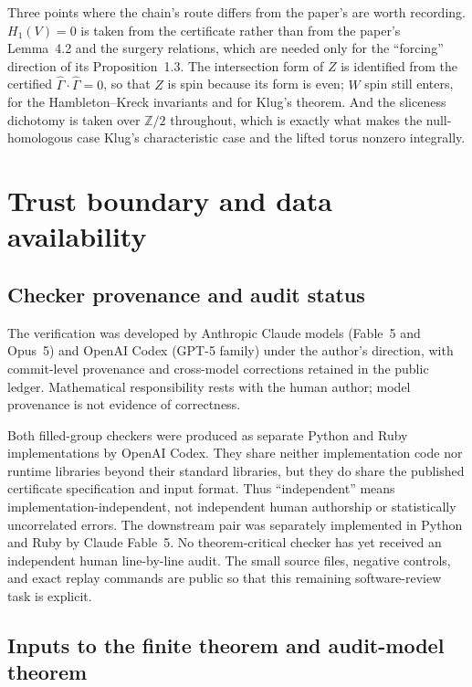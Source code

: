 \documentclass[11pt]{article}
\newcommand{\Z}{\mathbb{Z}}
\newcommand{\Ghat}{\widehat{\Gamma}}
\theoremstyle{definition}
\begin{document}
Three points where the chain's route differs from the paper's are worth
recording. $H_1(V)=0$ is taken from the certificate rather than from the
paper's Lemma~4.2 and the surgery relations, which are needed only for
the ``forcing'' direction of its Proposition~1.3. The intersection form
of $Z$ is identified from the certified $\Ghat\cdot\Ghat=0$, so that $Z$
is spin because its form is even; $W$ spin still enters, for the
Hambleton--Kreck invariants and for Klug's theorem. And the sliceness
dichotomy is taken over $\Z/2$ throughout, which is exactly what makes
the null-homologous case Klug's characteristic case and the lifted torus
nonzero integrally.

\section{Trust boundary and data availability}\label{sec:trust}

\subsection*{Checker provenance and audit status}

The verification was developed by Anthropic Claude models (Fable~5 and
Opus~5) and OpenAI Codex (GPT-5 family) under the author's direction, with
commit-level provenance and cross-model corrections retained in the public
ledger.  Mathematical responsibility rests with the human author; model
provenance is not evidence of correctness.

Both filled-group checkers were produced as separate Python and Ruby
implementations by OpenAI Codex.  They share neither implementation code nor
runtime libraries beyond their standard libraries, but they do share the
published certificate specification and input format.  Thus ``independent''
means implementation-independent, not independent human authorship or
statistically uncorrelated errors.  The downstream pair was separately
implemented in Python and Ruby by Claude Fable~5.  No theorem-critical
checker has yet received an independent human line-by-line audit.  The small
source files, negative controls, and exact replay commands are public so that
this remaining software-review task is explicit.

\subsection*{Inputs to the finite theorem and audit-model theorem}
\end{document}
